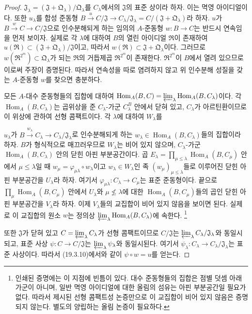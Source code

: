 \begin{proof}
$\mathfrak J_\lambda=(\mathfrak J+\mathfrak Q_\lambda)/
\mathfrak Q_\lambda$를 $C_\lambda$에서의 $\mathfrak J$의 표준 상이라
하자. 이는 멱영 아이디얼이다. 또한 $u_\lambda$를 합성 준동형
$B\xrightarrow{u}C/\mathfrak J\to C_\lambda/\mathfrak J_\lambda
=C/(\mathfrak J+\mathfrak Q_\lambda)$라 하자. $u$가
$B\xrightarrow{w}C\to C/\mathfrak J$으로 인수분해되게 하는 임의의
$A$-준동형 $w:B\to C$는 반드시 연속임을 먼저 보이자. 실제로 각
$\lambda$에 대하여 $B$의 열린 아이디얼 $\mathfrak R$이 존재하여
$u(\mathfrak R)\subset
(\mathfrak J+\mathfrak Q_\lambda)/\mathfrak J$이고, 따라서
$w(\mathfrak R)\subset\mathfrak J+
\mathfrak Q_\lambda$이다. 그러므로
$w(\mathfrak R^{2^m})\subset\mathfrak Q_\lambda$가 되는
$\mathfrak R$의 거듭제곱 $\mathfrak R^{2^m}$이 존재한다.
$\mathfrak R^{2^m}$이 $B$에서 열려 있으므로 이로써 주장이
증명된다. 따라서 연속성을 따로 염려하지 않고 위 인수분해 성질을
갖는 $A$-준동형 $w$를 찾으면 충분하다.

모든 $A$-대수 준동형들의 집합에 대하여
$\operatorname{Hom}_A(B,C)=
\varprojlim_\lambda\operatorname{Hom}_A(B,C_\lambda)$이다. 각
$\operatorname{Hom}_A(B,C_\lambda)$는 곱위상을 준
$C_\lambda$-가군 $C_\lambda^B$ 안에서 닫혀 있고,
$C_\lambda$가 아르틴환이므로 이 위상에 관하여 선형 콤팩트이다. 각
$\lambda$에 대하여 $W_\lambda$를


$u_\lambda$가
$B\xrightarrow{w_\lambda}C_\lambda\to
C_\lambda/\mathfrak J_\lambda$로 인수분해되게 하는
$w_\lambda\in\operatorname{Hom}_A(B,C_\lambda)$들의 집합이라 하자.
$B$가 형식적으로 매끄러우므로 $W_\lambda$는 비어 있지 않으며,
$C_\lambda$-가군 $\operatorname{Hom}_A(B,C_\lambda)$ 안의 닫힌 아핀
부분공간이다. 곱
$E_\lambda=\prod_{\mu\leq\lambda}
\operatorname{Hom}_A(B,C_\mu)$ 안에서 $\mu\leq\lambda$일 때
$w_\mu=\varphi_{\mu\lambda}\circ w_\lambda$이고
$w_\lambda\in W_\lambda$인 족
$(w_\mu)_{\mu\leq\lambda}$들로 이루어진 닫힌 아핀 부분공간을
$U_\lambda$라 하자. 여기서
$\varphi_{\mu\lambda}:C_\lambda\to C_\mu$는 표준 준동형이다. 끝으로
$\prod_\mu\operatorname{Hom}_A(B,C_\mu)$ 안에서 $U_\lambda$와
$\mu\not\leq\lambda$에 대한
$\operatorname{Hom}_A(B,C_\mu)$들의 곱인 닫힌 아핀 부분공간을
$V_\lambda$라 하자. 이제 $V_\lambda$들의 교집합이 비어 있지 않음을
보이면 된다. 실제로 이 교집합의 원소 $w$는 정의상
$\varprojlim_\lambda\operatorname{Hom}_A(B,C_\lambda)$에 속한다.
\footnote{인쇄된 증명에는 이 지점에 빈틈이 있다. 대수 준동형들의
집합은 점별 덧셈 아래 가군이 아니며, 일반 멱영 아이디얼에 대한
올림의 섬유는 아핀 부분공간일 필요가 없다. 따라서 제시된 선형
콤팩트성 논증만으로 이 교집합이 비어 있지 않음은 증명되지 않는다.
별도의 양립하는 올림 논증이 필요하다.}

또한 $\mathfrak J$가 닫혀 있고
$C=\varprojlim_\lambda C_\lambda$가 선형 콤팩트이므로
$C/\mathfrak J$는
$\varprojlim_\lambda C_\lambda/\mathfrak J_\lambda$와 동일시되고,
표준 사상 $\psi:C\to C/\mathfrak J$는
$\varprojlim_\lambda\psi_\lambda$와 동일시된다. 여기서
$\psi_\lambda:C_\lambda\to C_\lambda/\mathfrak J_\lambda$는 표준
사상이다. 따라서 (19.3.10)에서와 같이 $\psi\circ w=u$를 얻는다.
\end{proof}

